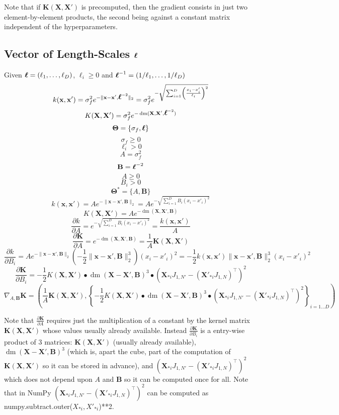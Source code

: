 \documentclass[a4paper,11pt]{article}
\newcommand\x{{\mathbf x}}
\newcommand\X{{\mathbf X}}
\newcommand\K{{\mathbf K}}
\newcommand\ELL{{\Ivec \ell}}
\DeclareMathOperator*{\dm}{dm}
\newcommand{\Ivec}[1]{\mbox{\boldmath $#1$}}
\begin{document}
Note that if $\K(\X,\X')$ is precomputed, then the gradient consists
in just two element-by-element products, the second being against a
constant matrix independent of the hyperparameters.

\subsection{Vector of Length-Scales $\Ivec{\ell}$}
Given $\Ivec{\ell} = (\ell_1,\ldots,\ell_D)$, $\ell_i \ge 0$ and
$\ELL^{-1} = (1/\ell_1,\ldots,1/\ell_D)$
$$k(\x,\x') = \sigma_f^2 e^{-\|\x-\x',\ELL^{-2}\|_2}= \sigma_f^2
  e^{-\sqrt{\sum_{i=1}^D \left(\frac{x_i - x'_i}{\ell_i}\right)^2}}$$
$$K(\X,\X') = \sigma_f^2 e^{-\dm(\X,\X',\ELL^{-2})}$$
$$\mathbf{\Theta} = \{ \sigma_f, \ELL\}$$
$$\sigma_f \ge 0$$
$$\ell_i > 0$$
$$A = \sigma_f^2$$
$$\mathbf{B} = \ELL^{-2}$$
$$A \ge 0$$
$$B_i > 0$$
$$\mathbf{\Theta}^* = \{ A, \mathbf{B}\}$$
$$k(\x,\x') = A e^{-\|\x-\x',\mathbf{B}\|_2} = A e^{-\sqrt{\sum_{i=1}^D
    B_i(x_i - x'_i)^2}}$$  
$$K(\X,\X') = A e^{-\dm(\X,\X',\mathbf{B})}$$
$$\frac{\partial k}{\partial A} = e^{-\sqrt{\sum_{i=1}^D B_i(x_i -
    x'_i)^2}} = \frac{k(\x,\x')}{A}$$
$$\frac{\partial \K}{\partial A} = e^{-\dm(\X,\X',\mathbf{B})} =
\frac{1}{A}\K(\X,\X')$$ 
$$\frac{\partial k}{\partial B_i} = A e^{-\|\x-\x',\mathbf{B}\|_2}
\left( -\frac{1}{2} \|\x-\x',\mathbf{B}\|_2^3 \right) (x_i - x'_i)^2 =
-\frac{1}{2} k(\x,\x') \|\x-\x',\mathbf{B}\|_2^3 (x_i - x'_i)^2 $$
$$\frac{\partial \K}{\partial B_i} = -\frac{1}{2} K(\X,\X')
\bullet \dm(\X-\X',\mathbf{B})^3 \bullet (\X_{*i}J_{1,N'}-
(\X'_{*i}J_{1,N})^{\top})^2$$
$$\nabla_{A,\mathbf{B}} \K = \left(\frac{1}{A}\K(\X,\X'), \left\{-\frac{1}{2}
    K(\X,\X') \bullet \dm(\X-\X',\mathbf{B})^3 \bullet
    (\X_{*i}J_{1,N'}- (\X'_{*i}J_{1,N})^{\top})^2 \right\}_{i=1 \ldots
    D} \right)$$

Note that $\frac{\partial \K}{\partial A}$ requires just the
multiplication of a constant by the kernel matrix $\K(\X,\X')$ whose
values usually already available. Instead $\frac{\partial \K}{\partial
  B_i}$ is a entry-wise product of 3 matrices: $\K(\X,\X')$ (usually
already available), $\dm(\X-\X',\mathbf{B})^3$ (which is, apart the
cube, part of the computation of $\K(\X,\X')$ so it can be stored in
advance), and $(\X_{*i}J_{1,N'}- (\X'_{*i}J_{1,N})^{\top})^2$ which
does not depend upon $A$ and $\mathbf{B}$ so it can be computed once
for all. Note that in NumPy $(\X_{*i}J_{1,N'}-
(\X'_{*i}J_{1,N})^{\top})^2$ can be computed as {\ttfamily
  numpy.subtract.outer($X_{*i},X'_{*i}$)**2}.
\end{document}
